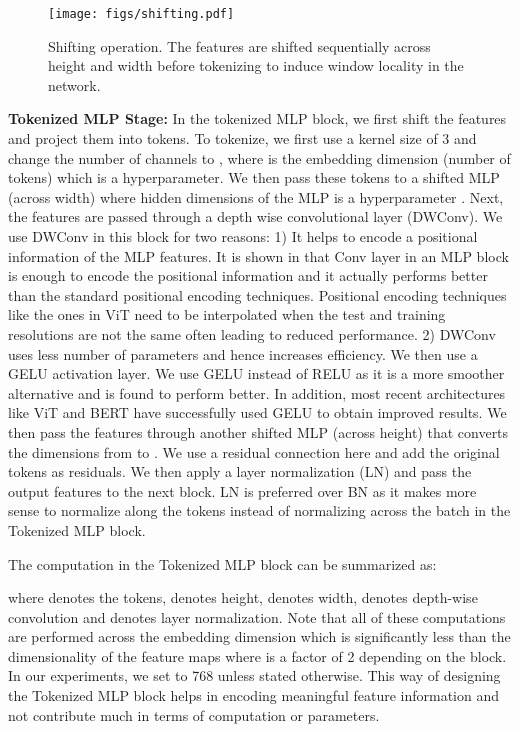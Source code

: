 \documentclass[runningheads]{llncs}
\begin{document}
\begin{figure*}[]
	\centering

	\texttt{[image: figs/shifting.pdf]}

	\caption{Shifting operation. The features are shifted sequentially across height and width before tokenizing to induce window locality in the network.   }  
	\label{shift}

\end{figure*}
\noindent \textbf{Tokenized MLP Stage:} In the tokenized MLP block, we first shift the features and project them into tokens. To tokenize, we first use a kernel size of 3 and change the number of channels to , where  is the embedding dimension (number of tokens) which is a hyperparameter. We then pass these tokens to a shifted MLP (across width)  where hidden dimensions of the MLP is a hyperparameter . Next, the features are passed through a depth wise convolutional layer (DWConv). We use DWConv in this block for two reasons: 1) It helps to encode a positional information of the MLP features. It is shown in \cite{xie2021segformer} that Conv layer in an MLP block is enough to encode the positional information and it actually performs better than the standard positional encoding techniques. Positional encoding techniques like the ones in ViT need to be interpolated when the test and training  resolutions are not the same often leading to reduced performance. 2) DWConv uses less number of parameters and hence increases efficiency. We then use a GELU \cite{hendrycks2016gaussian} activation layer. We use GELU instead of RELU as it is a more smoother alternative and is found to perform better.  In addition, most recent architectures like ViT \cite{dosovitskiy2020image} and BERT \cite{devlin2018bert} have successfully used GELU to obtain improved results. We then pass the features through another shifted MLP (across height) that converts the dimensions from  to . We use a residual connection here and add the original tokens as residuals. We then apply a layer normalization (LN) and pass the output features to the next block. LN is preferred over BN as it makes more sense to normalize along the tokens instead of normalizing across the batch in the Tokenized MLP block. 


The computation in the Tokenized MLP block can be summarized as:

where  denotes the tokens,  denotes height,  denotes width,  denotes depth-wise convolution and  denotes layer normalization. Note that all of these computations are performed across the embedding dimension  which is significantly less than the dimensionality of the feature maps  where  is a factor of 2 depending on the block. In our experiments, we set  to 768 unless stated otherwise. This way of designing the Tokenized MLP block helps in encoding meaningful feature information and not contribute much in terms of computation or parameters. 
\end{document}
